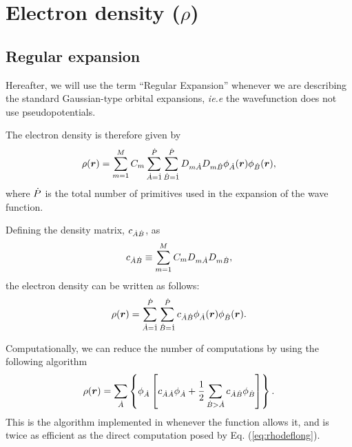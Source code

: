 \section{Electron density ($\rho$)}

\subsection{Regular expansion}

Hereafter, we will use the term ``Regular Expansion'' whenever we are describing
the standard Gaussian-type orbital expansions, \textit{ie.e} the wavefunction
does not use pseudopotentials.

The electron density is therefore given by
%
\begin{equation}
   \rho(\boldsymbol{r})=\sum_{m=1}^{M}C_m\sum_{\dot{A}=\dot{1}}^{\dot{P}}\sum_{\dot{B}=\dot{1}}^{\dot{P}}D_{m\dot{A}}D_{m\dot{B}}
                        \phi_{\dot{A}}(\boldsymbol{r})\phi_{\dot{B}}(\boldsymbol{r}),
\end{equation}
%
where $\dot{P}$ is the total number of primitives used in the expansion of the wave function.

Defining the density matrix, $c_{\dot{A}\dot{B}}$, as
%
\begin{equation}
   c_{\dot{A}\dot{B}}\equiv\sum_{m=1}^{M}C_mD_{m\dot{A}}D_{m\dot{B}},
\end{equation}
%
the electron density can be written as follows:
%
\begin{equation}\label{eq:rhodeflong}
   \rho(\boldsymbol{r})=\sum_{\dot{A}=\dot{1}}^{\dot{P}}\sum_{\dot{B}=\dot{1}}^{\dot{P}}
      c_{\dot{A}\dot{B}}\phi_{\dot{A}}(\boldsymbol{r})\phi_{\dot{B}}(\boldsymbol{r}).
\end{equation}
%

Computationally, we can reduce the number of computations by using the following algorithm
%
\begin{equation}
   \rho(\boldsymbol{r})=\sum_{\dot{A}}\left\{\phi_{\dot{A}}\left[c_{\dot{A}\dot{A}}\phi_{\dot{A}}+\frac{1}{2}\sum_{\dot{B}>\dot{A}}c_{\dot{A}\dot{B}}\phi_{\dot{B}}\right]\right\}.
\end{equation}
%
This is the algorithm implemented in \DTK{} whenever the function allows it, and is twice as efficient as the direct computation posed by Eq. (\ref{eq:rhodeflong}).

